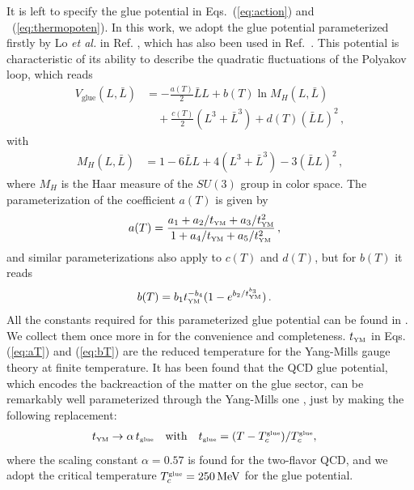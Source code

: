 \documentclass[%
reprint,
superscriptaddress,
showpacs,preprintnumbers,
 amsmath,amssymb,
 aps,
prd,
]{revtex4-1}
\begin{document}
It is left to specify the glue potential in Eqs.~(\ref{eq:action}) and ~(\ref{eq:thermopoten}). In this work, we adopt the glue potential parameterized firstly by Lo {\it et al.} in Ref. \cite{Lo:2013hla}, which has also been used in Ref.~\cite{Fu:2016tey}. This potential is characteristic of its ability to describe the quadratic fluctuations of the Polyakov loop, which reads
\begin{align}
  V_\text{glue}(L,\bar{L}) &= -\frac{a(T)}{2} \bar L L + b(T)\ln M_H(L,\bar{L})\nonumber \\[2ex]
  &\quad + \frac{c(T)}{2} (L^3+\bar L^3) + d(T) (\bar{L} L)^2\,,\label{eq:polpot}
\end{align}
with
\begin{align}
M_H (L, \bar{L})&= 1 -6 \bar{L}L + 4 (L^3+\bar{L}^3) - 3  (\bar{L}L)^2\,,
\end{align}
where $M_H$ is the Haar measure of the $SU(3)$ group in color space. The parameterization of the coefficient $a(T) $ is given by
\begin{align}
  a(T) &= \frac{a_1 + a_2/t_{\text{\tiny{YM}}} + a_3/t_{\text{\tiny{YM}}}^2}{1 + a_4/t_{\text{\tiny{YM}}} + a_5/t_{\text{\tiny{YM}}}^2}\,,\label{eq:aT}
\end{align}
and similar parameterizations also apply to $c(T)$ and $d(T)$, but for $b(T)$ it reads
\begin{align}
  b(T ) &= b_1 t_{\text{\tiny{YM}}}^{-b_4} (1 -e^{b_2/t_{\text{\tiny{YM}}}^{b_3}} )\,.\label{eq:bT}
\end{align}
All the constants required for this parameterized glue potential can be found in \cite{Lo:2013hla,Fu:2016tey}. We collect them once more in  for the convenience and completeness. $t_{\text{\tiny{YM}}}$ in Eqs. (\ref{eq:aT}) and (\ref{eq:bT}) are the reduced temperature for the Yang-Mills gauge theory at finite temperature. It has been found that the QCD glue potential, which encodes the backreaction of the matter on the glue sector, can be remarkably well parameterized through the Yang-Mills one \cite{Pawlowski:2010ht,Haas:2013qwp,Herbst:2013ufa}, just by making the following replacement:
\begin{align}
  t_{\text{\tiny{YM}}}&\rightarrow \alpha\,t_{\text{\tiny{glue}}}\quad \text{with}\quad t_{\text{\tiny{glue}}}=(T-T_c^\text{\tiny{glue}})/T_c^\text{\tiny{glue}},\label{}
\end{align}
where the scaling constant $\alpha=0.57$ is found for the two-flavor QCD, and we adopt the critical temperature $T_c^\text{\tiny{glue}}=250\,\mathrm{MeV}$ for the glue potential.
 
\end{document}
